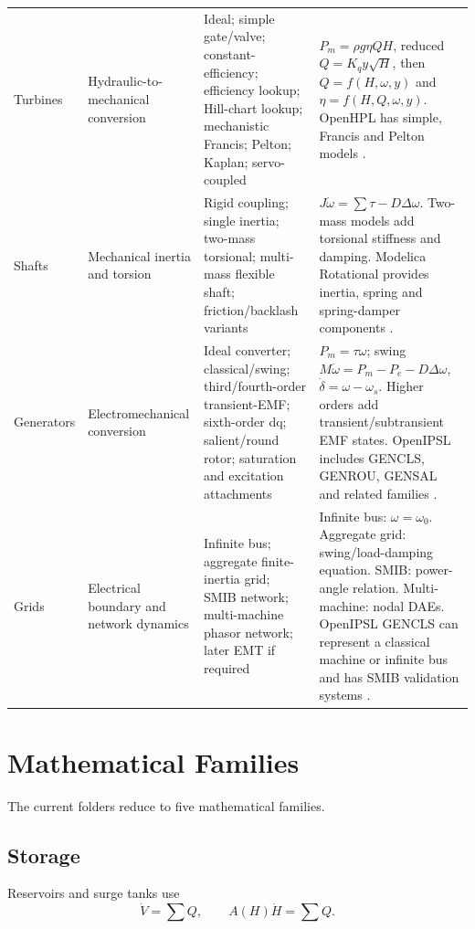 \documentclass[10pt,a4paper]{article}
\begin{document}
\begin{longtable}{p{2.2cm}p{3.0cm}p{4.8cm}p{5.1cm}}
Turbines &
Hydraulic-to-mechanical conversion &
Ideal; simple gate/valve; constant-efficiency; efficiency lookup; Hill-chart lookup; mechanistic Francis; Pelton; Kaplan; servo-coupled &
$P_m=\rho g\eta QH$, reduced $Q=K_qy\sqrt{H}$, then $Q=f(H,\omega,y)$ and $\eta=f(H,Q,\omega,y)$. OpenHPL has simple, Francis and Pelton models \cite{OpenHPLTurbines,OpenHPLFrancis}. \\[1ex]

Shafts &
Mechanical inertia and torsion &
Rigid coupling; single inertia; two-mass torsional; multi-mass flexible shaft; friction/backlash variants &
$J\dot\omega=\sum\tau-D\Delta\omega$. Two-mass models add torsional stiffness and damping. Modelica Rotational provides inertia, spring and spring-damper components \cite{MSLRotational}. \\[1ex]

Generators &
Electromechanical conversion &
Ideal converter; classical/swing; third/fourth-order transient-EMF; sixth-order dq; salient/round rotor; saturation and excitation attachments &
$P_m=\tau\omega$; swing $M\dot\omega=P_m-P_e-D\Delta\omega$, $\dot\delta=\omega-\omega_s$. Higher orders add transient/subtransient EMF states. OpenIPSL includes GENCLS, GENROU, GENSAL and related families \cite{OpenIPSLMachines}. \\[1ex]

Grids &
Electrical boundary and network dynamics &
Infinite bus; aggregate finite-inertia grid; SMIB network; multi-machine phasor network; later EMT if required &
Infinite bus: $\omega=\omega_0$. Aggregate grid: swing/load-damping equation. SMIB: power-angle relation. Multi-machine: nodal DAEs. OpenIPSL GENCLS can represent a classical machine or infinite bus and has SMIB validation systems \cite{GENCLS,OpenIPSLTests}. \\

\bottomrule
\end{longtable}
\normalsize

\section{Mathematical Families}
The current folders reduce to five mathematical families.

\subsection{Storage}
Reservoirs and surge tanks use
\[
\boxed{\dot V=\sum Q},\qquad
\boxed{A(H)\dot H=\sum Q}.
\]
\end{document}
